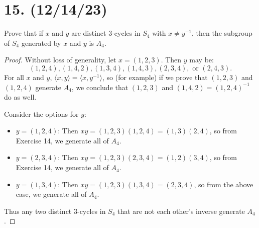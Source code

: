 \documentclass{article}
\begin{document}
\section*{15. (12/14/23)}

Prove that if $x$ and $y$ are distinct 3-cycles in $S_4$ with $x \neq y^{-1}$, then the subgroup of $S_4$ generated by $x$ and $y$ is $A_4$.

\begin{proof}
    Without loss of generality, let $x = (1, 2, 3)$. Then $y$ may be:
    \begin{equation*}
        (1, 2, 4), (1, 4, 2), (1, 3, 4), (1, 4, 3), (2, 3, 4), \text{ or } (2, 4, 3).
    \end{equation*}
    For all $x$ and $y$, $\langle x, y \rangle = \langle x, y^{-1} \rangle$, so (for example) if we prove that $(1, 2, 3)$ and $(1, 2, 4)$ generate $A_4$, we conclude that $(1, 2, 3)$ and $(1, 4, 2) = (1, 2, 4)^{-1}$ do as well.

    Consider the options for $y$:
    \begin{itemize}[itemsep=0em]
        \item $y = (1, 2, 4)$: Then $xy = (1, 2, 3)(1, 2, 4) = (1, 3)(2, 4)$, so from Exercise 14, we generate all of $A_4$.
        \item $y = (2, 3, 4)$: Then $xy = (1, 2, 3)(2, 3, 4) = (1, 2)(3, 4)$, so from Exercise 14, we generate all of $A_4$.
        \item $y = (1, 3, 4)$: Then $xy = (1, 2, 3)(1, 3, 4) = (2, 3, 4)$, so from the above case, we generate all of $A_4$.
    \end{itemize}
    Thus any two distinct 3-cycles in $S_4$ that are not each other's inverse generate $A_4$.
\end{proof}
\end{document}
